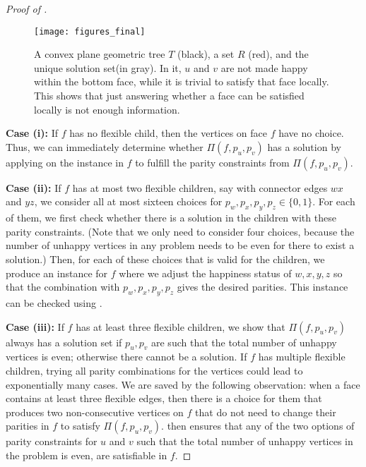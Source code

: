 \documentclass[a4paper,runningheads,cleveref,thm-restate]{lipics-v2021}
\newcommand{\hset}{solution set\xspace}
\newcommand{\invertible}{flexible\xspace}%
\begin{document}
\begin{proof}[Proof of ]
	\begin{figure}[htb]
		\centering
		\texttt{[image: figures\_final]}
		\caption{A convex plane geometric tree $T$ (black), a set $R$ (red), and the unique \hset (in gray). 
			In it, $u$ and $v$ are not made happy within the bottom face, while it is trivial to satisfy that face locally.  
			This shows that  just answering whether a face can be satisfied locally is not enough information. 
		}
		\label{fig:sketch-badcase-convex-tree}
	\end{figure}
	
	\smallskip
	
	{
	\noindent\textbf{Case (i):} If $f$ has no \invertible child, then the vertices on face $f$ have no choice. Thus, we can immediately determine whether $\Pi(f,p_u,p_v)$ has a solution by applying  on the instance in $f$ to fulfill the parity constraints from $\Pi(f,p_u,p_v)$. 
	}
	\smallskip
	
	{
	\noindent\textbf{Case (ii):} If $f$ has at most two \invertible children, say with connector edges $wx$ and $yz$, we consider all at most sixteen choices for $p_w,p_x,p_y,p_z\in \{0,1\}$. 
	For each of them, we first check whether there is a solution in the children with these parity constraints. 
	(Note that we only need to consider four choices, because the number of unhappy vertices in any problem needs to be even for there to exist a solution.)
	Then, for each of these choices that is valid for the children, 
	we produce an instance for $f$ where we adjust the happiness status of $w,x,y,z$ so that the combination with $p_w,p_x,p_y,p_z$ gives the desired parities. 
	This instance can be checked using .
	}
	\smallskip 
	
	{
	\noindent\textbf{Case (iii):} If $f$ has at least three \invertible children, we show that  $\Pi(f,p_u,p_v)$ always has a \hset if  $p_u,p_v$ are such that the total number of unhappy vertices is even; otherwise there cannot be a solution.}
	If $f$ has multiple \invertible children, 
	trying all parity combinations for the vertices could lead to exponentially many cases.  
	We are saved by the following observation: 
	when a face contains at least three \invertible edges, 
	then there is a choice for them that produces two non-consecutive vertices on $f$ that do not need to change their parities in $f$ to satisfy $\Pi(f,p_u,p_v)$. 
	 then ensures that any of the two options of parity constraints for $u$ and $v$ such that the total number of unhappy vertices in the problem is even, are satisfiable in $f$. 
	


\end{proof}
\end{document}
